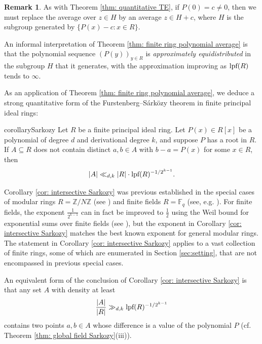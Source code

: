 \documentclass{amsart}
\theoremstyle{definition}
\newtheorem{remark}[theorem]{Remark}
\numberwithin{equation}{section}
\newcommand{\Z}{\mathbb{Z}}
\newcommand{\F}{\mathbb{F}}
\newcommand{\lpf}{\normalfont\text{lpf}}
\begin{document}
\begin{remark}
    As with Theorem \ref{thm: quantitative TE}, if $P(0) = c \ne 0$, then we must replace the average over $z \in H$ by an average $z \in H + c$, where $H$ is the subgroup generated by $\{P(x) - c : x \in R\}$.
\end{remark}

An informal interpretation of Theorem \ref{thm: finite ring polynomial average} is that the polynomial sequence $(P(y))_{y \in R}$ is \emph{approximately equidistributed} in the subgroup $H$ that it generates, with the approximation improving as $\lpf(R)$ tends to $\infty$.

As an application of Theorem \ref{thm: finite ring polynomial average}, we deduce a strong quantitative form of the Furstenberg--S\'{a}rk\"{o}zy theorem in finite principal ideal rings:

\begin{restatable}{corollary}{Sarkozy} \label{cor: intersective Sarkozy}
    Let $R$ be a finite principal ideal ring.
	Let $P(x) \in R[x]$ be a polynomial of degree $d$ and derivational degree $k$, and suppose $P$ has a root in $R$.
	If $A \subseteq R$ does not contain distinct $a, b \in A$ with $b - a = P(x)$ for some $x \in R$, then
	\begin{equation*}
		|A| \ll_{d,k} |R| \cdot \lpf(R)^{-1/2^{k-1}}.
	\end{equation*}
\end{restatable}

Corollary \ref{cor: intersective Sarkozy} was previous established in the special cases of modular rings $R = \Z/N\Z$ (see \cite{bb1}) and finite fields $R = \F_q$ (see, e.g. \cite{ls,ab_Sarkozy}).
For finite fields, the exponent $\frac{1}{2^{k-1}}$ can in fact be improved to $\frac{1}{2}$ using the Weil bound for exponential sums over finite fields (see \cite[Theorem 1.3]{ab_Sarkozy}), but the exponent in Corollary \ref{cor: intersective Sarkozy} matches the best known exponent for general modular rings.
The statement in Corollary \ref{cor: intersective Sarkozy} applies to a vast collection of finite rings, some of which are enumerated in Section \ref{sec:setting}, that are not encompassed in previous special cases.


An equivalent form of the conclusion of Corollary \ref{cor: intersective Sarkozy} is that any set $A$ with density at least
\begin{equation*}
    \frac{|A|}{|R|} \gg_{d,k} \lpf(R)^{-1/2^{k-1}}
\end{equation*}
contains two points $a, b \in A$ whose difference is a value of the polynomial $P$ (cf. Theorem \ref{thm: global field Sarkozy}(iii)).
\end{document}

